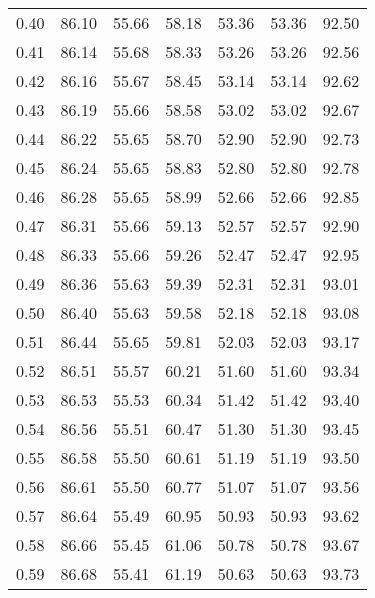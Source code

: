 \begin{tabular}{|c|c|c|c|c|c|c|}
      0.40 &     86.10 &     55.66 &      58.18 &   53.36 &      53.36 &         92.50 \\
      0.41 &     86.14 &     55.68 &      58.33 &   53.26 &      53.26 &         92.56 \\
      0.42 &     86.16 &     55.67 &      58.45 &   53.14 &      53.14 &         92.62 \\
      0.43 &     86.19 &     55.66 &      58.58 &   53.02 &      53.02 &         92.67 \\
      0.44 &     86.22 &     55.65 &      58.70 &   52.90 &      52.90 &         92.73 \\
      0.45 &     86.24 &     55.65 &      58.83 &   52.80 &      52.80 &         92.78 \\
      0.46 &     86.28 &     55.65 &      58.99 &   52.66 &      52.66 &         92.85 \\
      0.47 &     86.31 &     55.66 &      59.13 &   52.57 &      52.57 &         92.90 \\
      0.48 &     86.33 &     55.66 &      59.26 &   52.47 &      52.47 &         92.95 \\
      0.49 &     86.36 &     55.63 &      59.39 &   52.31 &      52.31 &         93.01 \\
      0.50 &     86.40 &     55.63 &      59.58 &   52.18 &      52.18 &         93.08 \\
      0.51 &     86.44 &     55.65 &      59.81 &   52.03 &      52.03 &         93.17 \\
      0.52 &     86.51 &     55.57 &      60.21 &   51.60 &      51.60 &         93.34 \\
      0.53 &     86.53 &     55.53 &      60.34 &   51.42 &      51.42 &         93.40 \\
      0.54 &     86.56 &     55.51 &      60.47 &   51.30 &      51.30 &         93.45 \\
      0.55 &     86.58 &     55.50 &      60.61 &   51.19 &      51.19 &         93.50 \\
      0.56 &     86.61 &     55.50 &      60.77 &   51.07 &      51.07 &         93.56 \\
      0.57 &     86.64 &     55.49 &      60.95 &   50.93 &      50.93 &         93.62 \\
      0.58 &     86.66 &     55.45 &      61.06 &   50.78 &      50.78 &         93.67 \\
      0.59 &     86.68 &     55.41 &      61.19 &   50.63 &      50.63 &         93.73 \\

\end{tabular}
